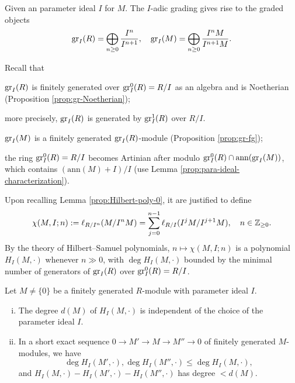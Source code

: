 Given an parameter ideal $I$ for $M$. The $I$-adic grading gives rise to the graded objects
\[ \operatorname{gr}_I(R) = \bigoplus_{n \geq 0} \frac{I^n}{I^{n+1}}, \quad \operatorname{gr}_I(M) = \bigoplus_{n \geq 0} \frac{I^n M}{I^{n+1}M}. \]

Recall that
\begin{compactitem}
	\item $\operatorname{gr}_I(R)$ is finitely generated over $\operatorname{gr}^0_I(R) = R/I$ as an algebra and is Noetherian (Proposition \ref{prop:gr-Noetherian});
	\item more precisely, $\operatorname{gr}_I(R)$ is generated by $\operatorname{gr}^1_I(R)$ over $R/I$.
	\item $\operatorname{gr}_I(M)$ is a finitely generated $\operatorname{gr}_I(R)$-module (Proposition \ref{prop:gr-fg});
	\item the ring $\operatorname{gr}^0_I(R) = R/I$ becomes Artinian after modulo $\operatorname{gr}^0_I(R) \cap \text{ann}(\operatorname{gr}_I(M))$, which contains $(\text{ann}(M)+I)/I$ (use Lemma \ref{prop:para-ideal-characterization}).
\end{compactitem}
Upon recalling Lemma \ref{prop:Hilbert-poly-0}, it are justified to define
\[ \chi(M, I; n) := \ell_{R/I^n}(M/I^n M) = \sum_{j=0}^{n-1} \ell_{R/I}(I^j M/I^{j+1} M), \quad n \in \mathbb{Z}_{\geq 0}. \]
By the theory of Hilbert--Samuel polynomials, $n \mapsto \chi(M,I; n)$ is a polynomial $H_I(M, \cdot)$ whenever $n \gg 0$, with $\deg H_I(M, \cdot)$ bounded by the minimal number of generators of $\operatorname{gr}_I(R)$ over $\operatorname{gr}^0_I(R) = R/I$.
\begin{lemma}\label{prop:Hilbert-poly-I}
	Let $M \neq \{0\}$ be a finitely generated $R$-module with parameter ideal $I$.
	\begin{enumerate}[(i)]
		\item The degree $d(M)$ of $H_I(M, \cdot)$ is independent of the choice of the parameter ideal $I$.
		\item In a short exact sequence $0 \to M' \to M \to M'' \to 0$ of finitely generated $M$-modules, we have
		\[ \deg H_I(M', \cdot), \deg H_I(M'', \cdot) \leq \deg H_I(M, \cdot), \]
		and $H_I(M, \cdot) - H_I(M', \cdot) - H_I(M'', \cdot)$ has degree $< d(M)$.
	\end{enumerate}
\end{lemma}
